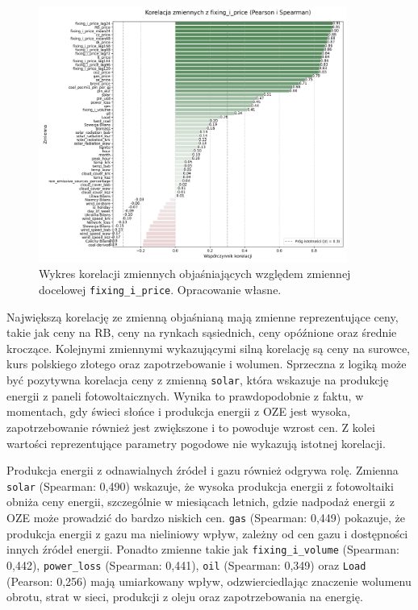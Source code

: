 \begin{figure}[H]
    \centering
    \includegraphics[width=0.9\textwidth]{../plots/correlation_with_fixing_i_price.png}
    \caption{Wykres korelacji zmiennych objaśniających względem zmiennej docelowej \texttt{fixing\_i\_price}. Opracowanie własne.}
    \label{fig:correlation_plot}
\end{figure}

Największą korelację ze zmienną objaśnianą mają zmienne reprezentujące ceny, takie jak ceny na RB, ceny na rynkach sąsiednich, ceny opóźnione oraz średnie kroczące. Kolejnymi zmiennymi wykazującymi silną korelację są ceny na surowce, kurs polskiego złotego oraz zapotrzebowanie i wolumen. Sprzeczna z logiką może być pozytywna korelacja ceny z zmienną \texttt{solar}, która wskazuje na produkcję energii z paneli fotowoltaicznych. Wynika to prawdopodobnie z faktu, w momentach, gdy świeci słońce i produkcja energii z OZE jest wysoka, zapotrzebowanie również jest zwiększone i to powoduje wzrost cen. Z kolei wartości reprezentujące parametry pogodowe nie wykazują istotnej korelacji. 

Produkcja energii z odnawialnych źródeł i gazu również odgrywa rolę. Zmienna \texttt{solar} (Spearman: 0,490) wskazuje, że wysoka produkcja energii z fotowoltaiki obniża ceny energii, szczególnie w miesiącach letnich, gdzie nadpodaż energii z OZE może prowadzić do bardzo niskich cen. \texttt{gas} (Spearman: 0,449) pokazuje, że produkcja energii z gazu ma nieliniowy wpływ, zależny od cen gazu i dostępności innych źródeł energii. Ponadto zmienne takie jak \texttt{fixing\_i\_volume} (Spearman: 0,442), \texttt{power\_loss} (Spearman: 0,441), \texttt{oil} (Spearman: 0,349) oraz \texttt{Load} (Pearson: 0,256) mają umiarkowany wpływ, odzwierciedlając znaczenie wolumenu obrotu, strat w sieci, produkcji z oleju oraz zapotrzebowania na energię.

